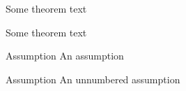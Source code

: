 \documentclass{smfart}
\begin{document}
\begin{theo}
Some theorem text
\end{theo}

\begin{rema}
Some theorem text
\end{rema}

\begin{enonce}{Assumption}
An assumption
\end{enonce}

\begin{enonce*}{Assumption}
An unnumbered assumption
\end{enonce*}

\end{document}
